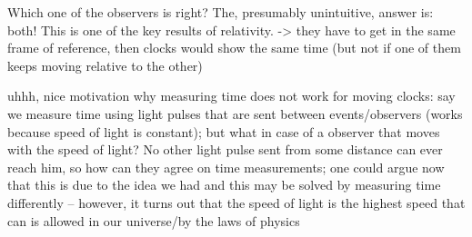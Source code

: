 Which one of the observers is right? The, presumably unintuitive, answer is: both! This is one of the key results of relativity. -> they have to get in the same frame of reference, then clocks would show the same time (but not if one of them keeps moving relative to the other)



uhhh, nice motivation why measuring time does not work for moving clocks: say we measure time using light pulses that are sent between events/observers (works because speed of light is constant); but what in case of a observer that moves with the speed of light? No other light pulse sent from some distance can ever reach him, so how can they agree on time measurements; one could argue now that this is due to the idea we had and this may be solved by measuring time differently -- however, it turns out that the speed of light is the highest speed that can is allowed in our universe/by the laws of physics

